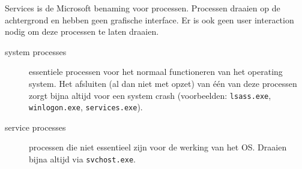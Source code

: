 Services is de Microsoft benaming voor processen. Processen draaien op de achtergrond en hebben geen grafische interface. Er is ook geen user interaction nodig om deze processen te laten draaien.

\begin{description}
	\item[system processes] essentiele processen voor het normaal functioneren van het operating system. Het afsluiten (al dan niet met opzet) van \'e\'en van deze processen zorgt bijna altijd voor een system crash (voorbeelden: \texttt{lsass.exe}, \texttt{winlogon.exe}, \texttt{services.exe}).
	\item[service processes] processen die niet essentieel zijn voor de werking van het OS. Draaien bijna altijd via \texttt{svchost.exe}.
\end{description}

